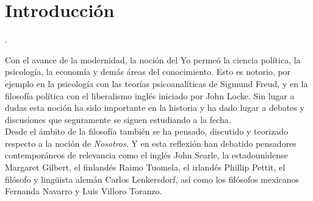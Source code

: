\documentclass[oneside]{book}
\begin{document}
\fancyhead[lo]{\slshape\nouppercase{\rightmark}}
\fancyhead[re]{\slshape\nouppercase{\leftmark}}

\renewcommand{\footrulewidth}{0.5pt}
\tableofcontents
\setcounter{tocdepth}{3} %
\mainmatter %

\chapter*{Introducción}
.

Con el avance de la modernidad, la noción del Yo permeó la ciencia política, la psicología, la economía y demás áreas del conocimiento. Esto es notorio, por ejemplo en la psicología con las teorías psicoanalíticas de Sigmund Freud\cite{Freud}, y en la filosofía política con el liberalismo inglés iniciado por John Locke\cite{Locke}. Sin lugar a dudas esta noción ha sido importante en la historia y ha dado lugar a debates y discusiones que seguramente se siguen estudiando a la fecha.\\

Desde el ámbito de la filosofía también se ha pensado, discutido y teorizado respecto a la noción de \textit{Nosotros}. Y en esta reflexión han debatido pensadores contemporáneos de relevancia como el inglés John Searle, la estadounidense Margaret Gilbert, el finlandés Raimo Tuomela, el irlandés Phillip Pettit, el filósofo y lingüista alemán Carlos Lenkersdorf, así como los filósofos mexicanos Fernanda Navarro y Luis Villoro Toranzo.
\end{document}
